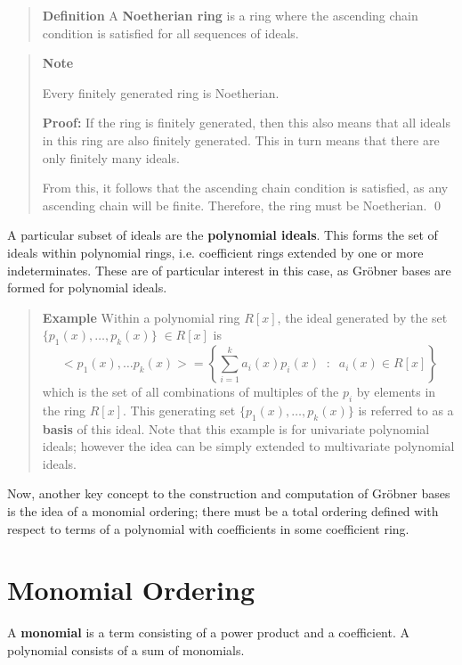 \documentclass[letterpaper,12pt,titlepage,oneside,final]{book}
\newenvironment{example}{\begin{quote}%
  \textbf{Example }%
  \quad
}{%
\end{quote}%
}
\newenvironment{defn}{\begin{quote}%
  \textbf{Definition }%
  \quad
}{%
\end{quote}%
}
\newenvironment{note}{\begin{quote}%
  \textbf{Note }%
  \quad
}{%
\end{quote}%
}
\begin{document}
\begin{defn}\label{Noetherian rings}
  A \textbf{Noetherian ring} is a ring where the ascending chain condition is satisfied for all sequences of ideals.
\end{defn}

\begin{note}
  Every finitely generated ring is Noetherian.

  \textbf{Proof:} If the ring is finitely generated, then this also means that all ideals in this ring are also finitely generated.  This in turn means that there are only finitely many ideals.  

  From this, it follows that the ascending chain condition is satisfied, as any ascending chain will be finite.  Therefore, the ring must be Noetherian.  \qed
\end{note}

A particular subset of ideals are the \textbf{polynomial ideals}.  This forms the set of ideals within polynomial rings, i.e. coefficient rings extended by one or more indeterminates.  These are of particular interest in this case, as Gr\"obner bases are formed for polynomial ideals.

\begin{example}\label{ex:polynom ideals}
  Within a polynomial ring ${R[x]}$, the ideal generated by the set ${\{p_1(x), \ldots, p_k(x)\} \; \in R[x]}$ is 
  \begin{equation*}
    <p_1(x), \ldots p_k(x)> = \left\{\sum_{i=1}^{k} a_i(x)p_i(x) \;\; : \;\; a_i(x) \in R[x]\right\}
  \end{equation*}
  which is the set of all combinations of multiples of the ${p_i}$ by elements in the ring ${R[x]}$.  This generating set ${\{p_1(x), \ldots, p_k(x)\}}$ is referred to as a \textbf{basis} of this ideal.  Note that this example is for univariate polynomial ideals; however the idea can be simply extended to multivariate polynomial ideals.
\end{example}

Now, another key concept to the construction and computation of Gr\"obner bases is the idea of a monomial ordering; there must be a total ordering defined with respect to terms of a polynomial with coefficients in some coefficient ring.

\section{Monomial Ordering}

A \textbf{monomial} is a term consisting of a power product and a coefficient.  A polynomial consists of a sum of monomials.
\end{document}
